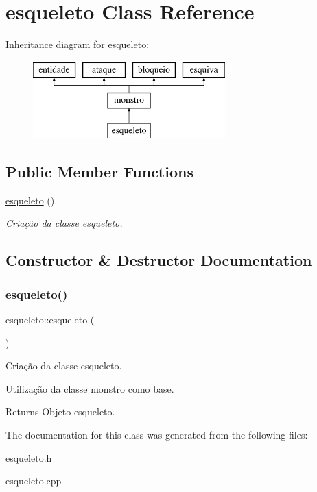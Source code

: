 \hypertarget{classesqueleto}{}\section{esqueleto Class Reference}
\label{classesqueleto}
Inheritance diagram for esqueleto\+:\begin{figure}[H]
\begin{center}
\leavevmode
\includegraphics[height=3.000000cm]{classesqueleto}
\end{center}
\end{figure}
\subsection*{Public Member Functions}
\begin{DoxyCompactItemize}
\item 
\mbox{\hyperlink{classesqueleto_a78b38d1c397903f66b1c527fd6dfef97}{esqueleto}} ()
\begin{DoxyCompactList}\small\item\em Criação da classe esqueleto. \end{DoxyCompactList}\end{DoxyCompactItemize}


\subsection{Constructor \& Destructor Documentation}
\mbox{\label{classesqueleto_a78b38d1c397903f66b1c527fd6dfef97}} 
\subsubsection{\texorpdfstring{esqueleto()}{esqueleto()}}
{\footnotesize\ttfamily esqueleto\+::esqueleto (\begin{DoxyParamCaption}{ }\end{DoxyParamCaption})}



Criação da classe esqueleto. 

Utilização da classe monstro como base. \begin{DoxyReturn}{Returns}
Objeto esqueleto. 
\end{DoxyReturn}


The documentation for this class was generated from the following files\+:\begin{DoxyCompactItemize}
\item 
esqueleto.\+h\item 
esqueleto.\+cpp\end{DoxyCompactItemize}
